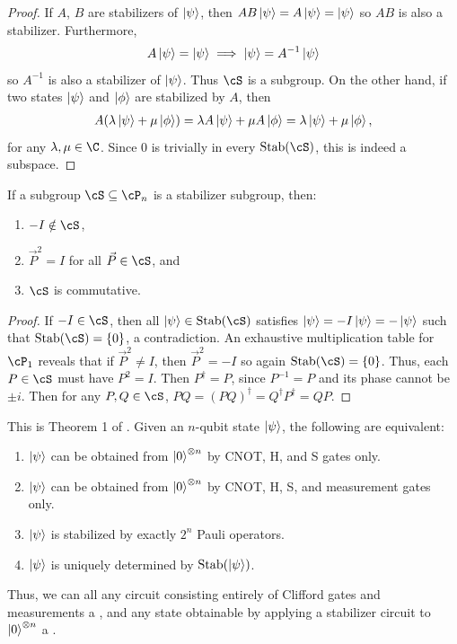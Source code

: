 \begin{proof}
If $A$, $B$ are stabilizers of $\ket\psi$, then $AB \ket\psi = A \ket\psi = \ket\psi$ so $AB$ is also a stabilizer. Furthermore,
\begin{align}
    A \ket\psi = \ket \psi 
    \implies 
    \ket\psi = A^{-1} \ket\psi
\end{align}
so $A^{-1}$ is also a stabilizer of $\ket\psi$. Thus $\cS$ is a subgroup. On the other hand, if two states $\ket\psi$ and $\ket\phi$ are stabilized by $A$, then 
\begin{align}
    A (\lambda\ket\psi + \mu \ket\phi) 
    = \lambda A \ket\psi + \mu A \ket \phi 
    = \lambda \ket\psi + \mu \ket\phi,
\end{align}
for any $\lambda, \mu \in \C$. Since $0$ is trivially in every $\Stab(\cS)$, this is indeed a subspace.
\end{proof}

\begin{lemma}
\label{lemma:stab-group-properties}
If a subgroup $\cS \subseteq \cP_n$ is a stabilizer subgroup, then:
\begin{enumerate}
    \item $-I \notin \cS$,
    \item $\vec{P}^2 = I$ for all $\vec{P} \in \cS$, and
    \item $\cS$ is commutative.
\end{enumerate}
\end{lemma}

\begin{proof}
If $-I \in \cS$, then all $\ket\psi \in \Stab(\cS)$ satisfies $\ket\psi = -I \ket\psi = -\ket\psi$ such that $\Stab(\cS) = \{0\}$, a contradiction. An exhaustive multiplication table for $\cP_1$ reveals that if $\vec{P}^2 \neq I$, then $\vec{P}^2 = -I$ so again $\Stab(\cS) = \{0\}$. Thus, each $P \in \cS$ must have $P^2 = I$. Then $P^\dagger = P$, since $P^{-1} = P$ and its phase cannot be $\pm i$. Then for any $P,Q \in \cS$, $PQ = (PQ)^\dagger = Q^\dagger P^\dagger = QP$.
\end{proof}

\begin{theorem}
\label{thm:aaronson-sim-clifford}
This is Theorem 1 of \cite{sim_stab_circuits}. Given an $n$-qubit state $\ket\psi$, the following are equivalent:
\begin{enumerate}
    \item $\ket\psi$ can be obtained from $\ket{0}^{\otimes n}$ by CNOT, H, and S gates only.
    \item $\ket\psi$ can be obtained from $\ket{0}^{\otimes n}$ by CNOT, H, S, and measurement gates only.
    \item $\ket\psi$ is stabilized by exactly $2^n$ Pauli operators.
    \item $\ket\psi$ is uniquely determined by $\operatorname{Stab}(\ket\psi)$.
\end{enumerate}
Thus, we can all any circuit consisting entirely of Clifford gates and measurements a , and any state obtainable by applying a stabilizer circuit to $\ket{0}^{\otimes n}$ a .
\end{theorem}

